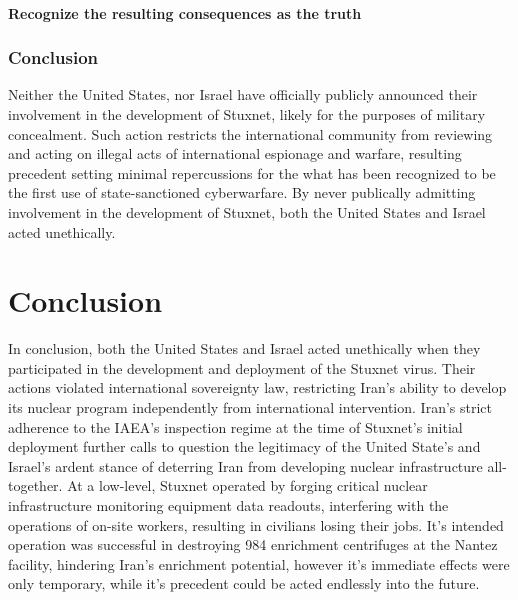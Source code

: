 \documentclass[12pt]{article}
\begin{document}
\begin{multicols}{2}
\paragraph{Recognize the resulting consequences as the truth}

\subsubsection{Conclusion}

Neither the United States, nor Israel have officially publicly announced their involvement in the development of Stuxnet, likely for the purposes of military concealment. Such action restricts the international community from reviewing and acting on illegal acts of international espionage and warfare, resulting precedent setting minimal repercussions for the what has been recognized to be the first use of state-sanctioned cyberwarfare. By never publically admitting involvement in the development of Stuxnet, both the United States and Israel acted unethically.


\section{Conclusion}

In conclusion, both the United States and Israel acted unethically when they participated in the development and deployment of the Stuxnet virus. Their actions violated international sovereignty law, restricting Iran's ability to develop its nuclear program independently from international intervention. Iran's strict adherence to the IAEA's inspection regime at the time of Stuxnet's initial deployment further calls to question the legitimacy of the United State's and Israel's ardent stance of deterring Iran from developing nuclear infrastructure all-together. At a low-level, Stuxnet operated by forging critical nuclear infrastructure monitoring equipment data readouts, interfering with the operations of on-site workers, resulting in civilians losing their jobs. It's intended operation was successful in destroying 984 enrichment centrifuges at the Nantez facility, hindering Iran's enrichment potential, however it's immediate effects were only temporary, while it's precedent could be acted endlessly into the future.
 

\end{multicols}




\newpage

\end{document}
